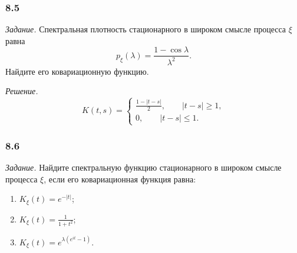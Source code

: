 \subsubsection*{8.5}

\textit{Задание.}
Спектральная плотность стационарного в широком смысле процесса $ \xi $ равна
$$p_{ \xi } \left( \lambda \right) =
  \frac{1 - \cos \lambda }{ \lambda^2}.$$
Найдите его ковариационную функцию.

\textit{Решение.}
$$K \left( t, s \right) =
  \begin{cases}
    \frac{1 - \left| t - s \right| }{2}, \qquad \left| t - s \right| \geq 1, \\
    0, \qquad \left| t - s \right| \leq 1.
  \end{cases}$$

\subsubsection*{8.6}

\textit{Задание.}
Найдите спектральную функцию стационарного в широком смысле процесса $ \xi $,
если его ковариационная функция равна:
\begin{enumerate}[label=\alph*)]
  \item $K_{ \xi } \left( t \right) = e^{-\left| t \right| }$;
  \item $K_{ \xi } \left( t \right) = \frac{1}{1 + t^2}$;
  \item $K_{ \xi } \left( t \right) = e^{ \lambda \left( e^{it} - 1 \right) }$.
\end{enumerate}

